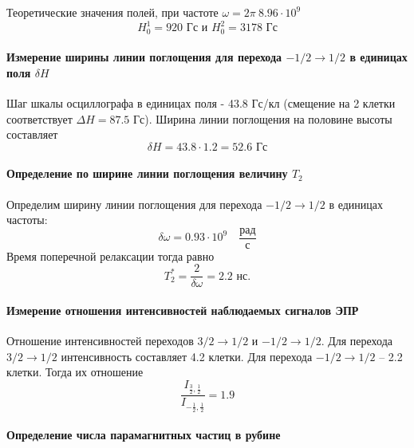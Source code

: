 Теоретические значения полей, при частоте $\omega = 2\pi ~8.96\cdot 10^9 $
\begin{equation}
    H_0^1 = 920 \text{ Гс} \text{ и } H_0^2 = 3178 \text{ Гс}
\end{equation}

\paragraph{Измерение ширины линии поглощения для перехода $-1/2\rightarrow 1/2$ в единицах поля $\delta H$}
Шаг шкалы осциллографа в единицах поля - 43.8 Гс/кл (смещение на 2 клетки соответствует $\Delta H = 87.5$ Гс). Ширина линии поглощения
на половине высоты составляет 
\begin{equation}
    \delta H = 43.8 \cdot 1.2 = 52.6 \text{ Гс}
    \label{eq:}
\end{equation}
\paragraph{Определение по ширине линии поглощения величину $T_2$}
Определим ширину линии поглощения для перехода $-1/2\rightarrow 1/2$ в единицах частоты:
\begin{equation}
    \label{eq:}
    \delta \omega = 0.93 \cdot 10^{9} \quad \frac{\text{рад}}{\text{с}}
\end{equation}
Время поперечной релаксации тогда равно
\begin{equation}
    \label{eq:}
    T_2^* = \frac{2}{\delta \omega}  = 2.2 \text{ нс.} 
\end{equation}

\paragraph{Измерение отношения интенсивностей наблюдаемых сигналов ЭПР}
Отношение интенсивностей переходов $3/2 \rightarrow 1/2$ и $-1/2\rightarrow 1/2$. Для перехода $3/2 \rightarrow 1/2$
интенсивность составляет 4.2 клетки. Для перехода $-1/2 \rightarrow 1/2$ -- 2.2 клетки. Тогда их отношение
\begin{equation}
    \frac{I_{\frac32,\frac12}}{I_{-\frac12,\frac12}} = 1.9
    \label{eq:}
\end{equation}
\paragraph{Определение числа парамагнитных частиц в рубине}

